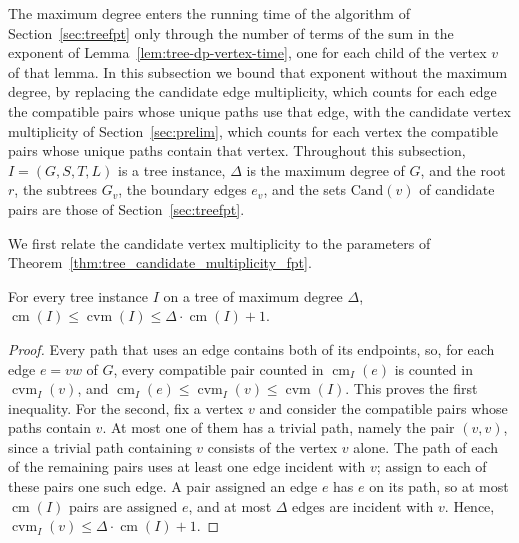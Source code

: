 \documentclass[a4paper,USenglish,thm-restate]{lipics-v2021}
\newcommand{\cm}{\operatorname{cm}}
\newcommand{\cvm}{\operatorname{cvm}}
\newcommand{\cand}{\mathrm{Cand}}
\theoremstyle{problemstyle}
\begin{document}
The maximum degree enters the running time of the algorithm of Section~\ref{sec:treefpt} only through the number of terms of the sum in the exponent of Lemma~\ref{lem:tree-dp-vertex-time}, one for each child of the vertex $v$ of that lemma. In this subsection we bound that exponent without the maximum degree, by replacing the candidate edge multiplicity, which counts for each edge the compatible pairs whose unique paths use that edge, with the candidate vertex multiplicity of Section~\ref{sec:prelim}, which counts for each vertex the compatible pairs whose unique paths contain that vertex. Throughout this subsection, $I=(G,S,T,L)$ is a tree instance, $\Delta$ is the maximum degree of $G$, and the root $r$, the subtrees $G_v$, the boundary edges $e_v$, and the sets $\cand(v)$ of candidate pairs are those of Section~\ref{sec:treefpt}.

We first relate the candidate vertex multiplicity to the parameters of Theorem~\ref{thm:tree_candidate_multiplicity_fpt}.

\begin{observation}\label{obs:cvm-vs-cm}
For every tree instance $I$ on a tree of maximum degree $\Delta$, $\cm(I)\le\cvm(I)\le\Delta\cdot\cm(I)+1$.
\end{observation}

\begin{proof}
Every path that uses an edge contains both of its endpoints, so, for each edge $e=vw$ of $G$, every compatible pair counted in $\cm_I(e)$ is counted in $\cvm_I(v)$, and $\cm_I(e)\le\cvm_I(v)\le\cvm(I)$. This proves the first inequality. For the second, fix a vertex $v$ and consider the compatible pairs whose paths contain $v$. At most one of them has a trivial path, namely the pair $(v,v)$, since a trivial path containing $v$ consists of the vertex $v$ alone. The path of each of the remaining pairs uses at least one edge incident with $v$; assign to each of these pairs one such edge. A pair assigned an edge $e$ has $e$ on its path, so at most $\cm(I)$ pairs are assigned $e$, and at most $\Delta$ edges are incident with $v$. Hence, $\cvm_I(v)\le\Delta\cdot\cm(I)+1$.
\end{proof}
\end{document}
